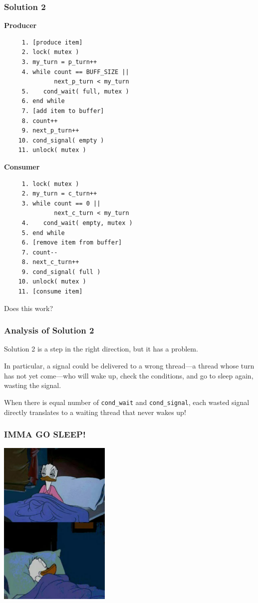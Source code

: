 \begin{frame}[fragile]
	\frametitle{Solution 2}

	\begin{multicols}{2}
		\small
		\textbf{Producer}
		\begin{verbatim}
	 1. [produce item]
	 2. lock( mutex )
	 3. my_turn = p_turn++
	 4. while count == BUFF_SIZE ||
	          next_p_turn < my_turn
	 5.    cond_wait( full, mutex )
	 6. end while
	 7. [add item to buffer]
	 8. count++
	 9. next_p_turn++
	10. cond_signal( empty )
	11. unlock( mutex )
		\end{verbatim}
		\columnbreak
		\textbf{Consumer}\vspace{-2em}
		\begin{verbatim}
	 1. lock( mutex )
	 2. my_turn = c_turn++
	 3. while count == 0 ||
	          next_c_turn < my_turn
	 4.    cond_wait( empty, mutex )
	 5. end while
	 6. [remove item from buffer]
	 7. count--
	 8. next_c_turn++
	 9. cond_signal( full )
	10. unlock( mutex )
	11. [consume item]
		\end{verbatim}
	\end{multicols}
	\vspace{-2em}

	Does this work?

\end{frame}

\begin{frame}
	\frametitle{Analysis of Solution 2}
	Solution 2 is a step in the right direction, but it has a problem.

	In particular, a signal could be delivered to a \alert{wrong} thread—a thread whose turn has not yet come—who will wake up, check the conditions, and go to sleep again, wasting the signal.

	When there is equal number of \texttt{cond\_wait} and \texttt{cond\_signal}, each wasted signal directly translates to a waiting thread that never wakes up!

\end{frame}

\begin{frame}
	\frametitle{IMMA GO SLEEP!}

	\begin{center}
		\includegraphics[width=0.4\textwidth]{images/sleepagain}
	\end{center}
\end{frame}

